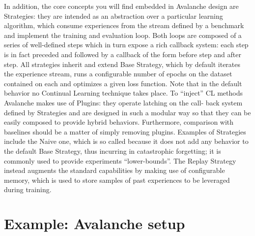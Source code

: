 \documentclass[english, LaM, oneside]{sapthesis}%
\begin{document}
 
In addition, the core concepts you will find embedded in Avalanche design are Strategies: they are intended as an abstraction over a particular learning algorithm, which consume experiences from the stream defined by a benchmark and implement the training and evaluation loop. Both loops are composed of a series of well-defined steps which in turn expose a rich callback system: each step is in fact preceded and followed by a callback of the form before step and after step. All strategies inherit and extend Base Strategy, which by default iterates the experience stream, runs a configurable number of epochs on the dataset contained on each and optimizes a given loss function. Note that in the default behavior no Continual Learning technique takes place. To “inject” CL methods Avalanche makes use of Plugins: they operate latching on the call- back system defined by Strategies and are designed in such a modular way so that they can be easily composed to provide hybrid behaviors. Furthermore, comparison with baselines should be a matter of simply removing plugins.
Examples of Strategies include the Naive one, which is so called because it does not add any behavior to the default Base Strategy, thus incurring in catastrophic forgetting; it is commonly used to provide experiments “lower-bounds”. The Replay Strategy instead augments the standard capabilities by making use of configurable memory, which is used to store samples of past experiences to be leveraged during training. 

        
        
\section{Example: Avalanche setup}
\end{document}
